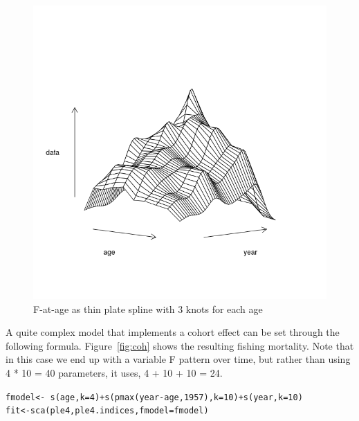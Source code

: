 \documentclass[a4paper,english,10pt]{article}\usepackage[]{graphicx}\usepackage[]{color}
\makeatletter
\newcommand{\hlnum}[1]{\textcolor[rgb]{0.063,0.58,0.627}{#1}}%
\newcommand{\hlopt}[1]{\textcolor[rgb]{0.196,0.196,0.196}{#1}}%
\newcommand{\hlstd}[1]{\textcolor[rgb]{0.196,0.196,0.196}{#1}}%
\newcommand{\hlkwb}[1]{\textcolor[rgb]{0.627,0,0.314}{#1}}%
\newcommand{\hlkwc}[1]{\textcolor[rgb]{0,0.631,0.314}{#1}}%
\newcommand{\hlkwd}[1]{\textcolor[rgb]{0.78,0.227,0.412}{#1}}%
\newenvironment{kframe}{%
 \def\at@end@of@kframe{}%
 \ifinner\ifhmode%
  \def\at@end@of@kframe{\end{minipage}}%
  \begin{minipage}{\columnwidth}%
 \fi\fi%
 \def\FrameCommand##1{\hskip\@totalleftmargin \hskip-\fboxsep
 \colorbox{shadecolor}{##1}\hskip-\fboxsep
     \hskip-\linewidth \hskip-\@totalleftmargin \hskip\columnwidth}%
 \MakeFramed {\advance\hsize-\width
   \@totalleftmargin\z@ \linewidth\hsize
   \@setminipage}}%
 {\par\unskip\endMakeFramed%
 \at@end@of@kframe}
\newenvironment{knitrout}{}{} %
\makeatother
\begin{document}
\begin{knitrout}
\color{fgcolor}\begin{figure}[H]

{\centering \includegraphics[width=.9\linewidth]{figure/ageind-1} 

}

\caption[F-at-age as thin plate spline with 3 knots for each age]{F-at-age as thin plate spline with 3 knots for each age}\label{fig:ageind}
\end{figure}


\end{knitrout}

A quite complex model that implements a cohort effect can be set through the following formula. Figure~\ref{fig:coh} shows the resulting fishing mortality. Note that in this case we end up with a variable F pattern over time, but rather than using 4 * 10 = 40 parameters, it uses, 4 + 10 + 10 = 24.

\begin{knitrout}
\color{fgcolor}\begin{kframe}
\begin{alltt}
\hlstd{fmodel} \hlkwb{<-} \hlopt{~}\hlkwd{s}\hlstd{(age,} \hlkwc{k} \hlstd{=} \hlnum{4}\hlstd{)} \hlopt{+} \hlkwd{s}\hlstd{(}\hlkwd{pmax}\hlstd{(year} \hlopt{-} \hlstd{age,} \hlnum{1957}\hlstd{),} \hlkwc{k} \hlstd{=} \hlnum{10}\hlstd{)} \hlopt{+} \hlkwd{s}\hlstd{(year,} \hlkwc{k} \hlstd{=} \hlnum{10}\hlstd{)}
\hlstd{fit} \hlkwb{<-} \hlkwd{sca}\hlstd{(ple4, ple4.indices,} \hlkwc{fmodel} \hlstd{= fmodel)}
\end{alltt}
\end{kframe}
\end{knitrout}
\end{document}

